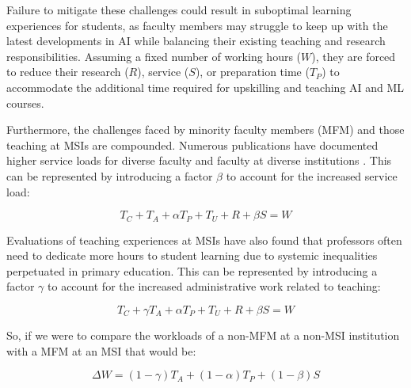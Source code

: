 \documentclass[11pt]{article}
\begin{document}
Failure to mitigate these challenges could result in suboptimal learning experiences for students, as faculty members may struggle to keep up with the latest developments in AI while balancing their existing teaching and research responsibilities. Assuming a fixed number of working hours ($W$), they are forced to reduce their research ($R$), service ($S$), or preparation time ($T_P$) to accommodate the additional time required for upskilling and teaching AI and ML courses.

Furthermore, the challenges faced by minority faculty members (MFM) and those teaching at MSIs are compounded. Numerous publications have documented higher service loads for diverse faculty and faculty at diverse institutions \cite{hanasono2019secre, o2017asked}. This can be represented by introducing a factor $\beta$ to account for the increased service load:

\begin{equation}
    T_C + T_A + \alpha T_P + T_U + R + \beta S = W
\end{equation}




Evaluations of teaching experiences at MSIs have also found that professors often need to dedicate more hours to student learning \cite{conrad2015educating} due to systemic inequalities perpetuated in primary education. This can be represented by introducing a factor $\gamma$ to account for the increased administrative work related to teaching:

\begin{equation}
    T_C + \gamma T_A + \alpha T_P + T_U + R + \beta S = W
\end{equation}


So, if we were to compare the workloads of a non-MFM at a non-MSI institution with a MFM at an MSI that would be: 

\begin{equation}
    \Delta W = (1-\gamma)T_A + (1-\alpha) T_P + (1-\beta) S
\end{equation}
\end{document}
